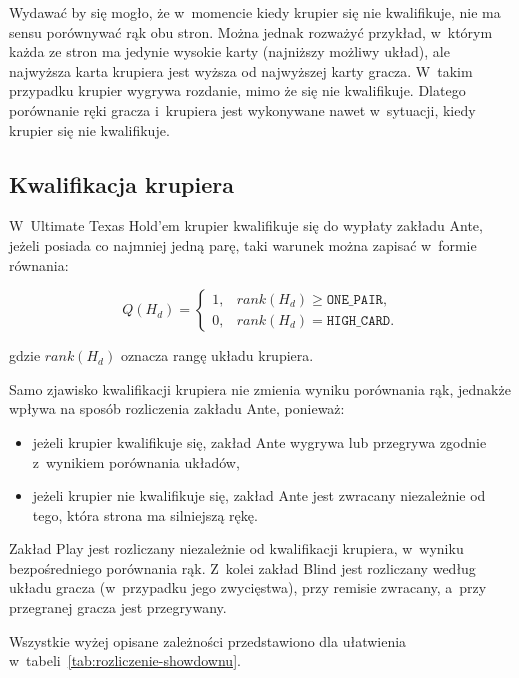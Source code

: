 Wydawać by się mogło, że w~momencie kiedy krupier się nie kwalifikuje, nie ma sensu porównywać rąk obu stron.
Można jednak rozważyć przykład, w~którym każda ze stron ma jedynie wysokie karty (najniższy możliwy układ),
ale najwyższa karta krupiera jest wyższa od najwyższej karty gracza. W~takim przypadku krupier wygrywa rozdanie, mimo że się nie kwalifikuje.
Dlatego porównanie ręki gracza i~krupiera jest wykonywane nawet w~sytuacji, kiedy krupier się nie kwalifikuje.

\subsection{Kwalifikacja krupiera}
\label{subsec:kwalifikacja-krupiera}

W~Ultimate Texas Hold’em krupier kwalifikuje się do wypłaty zakładu Ante,
jeżeli posiada co najmniej jedną parę, taki warunek można zapisać w~formie równania:

\begin{equation}
    Q(H_d)
    =
    \begin{cases}
        1, & rank(H_d) \geq \texttt{ONE\_PAIR}, \\
        0, & rank(H_d) = \texttt{HIGH\_CARD}.
    \end{cases}
\end{equation}

gdzie \(rank(H_d)\) oznacza rangę układu krupiera.

Samo zjawisko kwalifikacji krupiera nie zmienia wyniku porównania rąk, jednakże wpływa na sposób
rozliczenia zakładu Ante, ponieważ:

\begin{itemize}
    \item jeżeli krupier kwalifikuje się, zakład Ante wygrywa lub przegrywa zgodnie
          z~wynikiem porównania układów,
    \item jeżeli krupier nie kwalifikuje się, zakład Ante jest zwracany niezależnie
          od tego, która strona ma silniejszą rękę.
\end{itemize}

Zakład Play jest rozliczany niezależnie od kwalifikacji krupiera, w~wyniku bezpośredniego porównania rąk.
Z~kolei zakład Blind jest rozliczany według układu gracza (w~przypadku jego
zwycięstwa), przy remisie zwracany, a~przy przegranej gracza jest przegrywany.

Wszystkie wyżej opisane zależności przedstawiono dla ułatwienia w~tabeli~\ref{tab:rozliczenie-showdownu}.

